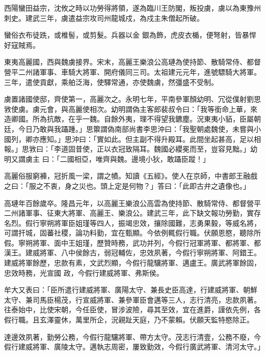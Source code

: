 \begin{pinyinscope}
 西陽蠻田益宗，沈攸之時以功勞得將領，遂為臨川王防閣，叛投虜，虜以為東豫州刺史。建武三年，虜遣益宗攻司州龍城戍，為戍主朱僧起所破。



 蠻俗衣布徒跣，或椎髻，或剪髮。兵器以金
 銀為飾，虎皮衣楯，便弩射，皆暴悍好寇賊焉。



 東夷高麗國，西與魏虜接界。宋末，高麗王樂浪公高璉為使持節、散騎常侍、都督營平二州諸軍事、車騎大將軍、開府儀同三司。太祖建元元年，進號驃騎大將軍。三年，遣使貢獻，乘舶泛海，使驛常通，亦使魏虜，然彊盛不受制。



 虜置諸國使邸，齊使第一，高麗次之。永明七年，平南參軍顏幼明、冗從僕射劉思敩使虜。虜元會，與高麗使相次。幼明謂偽主客郎裴叔令曰：「我等銜命上華，來造卿國。所為抗敵，在乎一魏。自餘外夷，理不得望我鑣塵。況東夷小貊，臣屬朝廷，今日乃敢與我躡踵。」思籞謂偽南部尚書李思沖曰：「我聖朝處魏使，未嘗與小國列，卿亦應知。」思沖曰：「實如此。但主副不得升殿耳。此間坐起甚高，足以相報。」思敩曰：「李道固昔使，正以衣冠致隔耳。魏國必纓冕而至，豈容見黜。」幼明又謂虜主
 曰：「二國相亞，唯齊與魏。邊境小狄，敢躡臣蹤！」



 高麗俗服窮褲，冠折風一梁，謂之幘。知讀《五經》。使人在京師，中書郎王融戲之曰：「服之不衷，身之災也。頭上定是何物？」答曰：「此即古弁之遺像也。」



 高璉年百餘歲卒。隆昌元年，以高麗王樂浪公高雲為使持節、散騎常侍、都督營平二州諸軍事、征東大將軍、高麗王、樂浪公。建武三年，此下缺文報功勞勤，實存
 名烈。假行寧朔將軍臣姐瑾等四人，振竭忠效，攘除國難，志勇果毅，等威名將，可謂扞城，固蕃社稷，論功料勤，宜在甄顯。今依例輒假行職。伏願恩愍，聽除所假。寧朔將軍、面中王姐瑾，歷贊時務，武功并列，今假行冠軍將軍、都將軍、都漢王。建威將軍、八中侯餘古，弱冠輔佐，忠效夙著，今假行寧朔將軍、阿錯王。建威將軍餘歷，忠款有素，文武烈顯，今假行龍驤將軍、邁盧王。廣武將軍餘固，忠效時務，光宣國
 政，今假行建威將軍、弗斯侯。



 牟大又表曰：「臣所遣行建威將軍、廣陽太守、兼長史臣高達，行建威將軍、朝鮮太守、兼司馬臣楊茂，行宣威將軍、兼參軍臣會邁等三人，志行清亮，忠款夙著。往泰始中，比使宋朝，今任臣使，冒涉波險，尋其至效，宜在進爵，謹依先例，各假行職。且玄澤靈休，萬里所企，況親趾天庭，乃不蒙賴。伏願天監特愍除正。



 達邊效夙著，勤勞公務，今假行龍驤將軍、帶方太守。茂志行清壹，公務不廢，今假行建威將軍、廣陵太守。邁執志周密，屢致勤效，今假行廣武將軍、清河太守。」




\end{pinyinscope}
